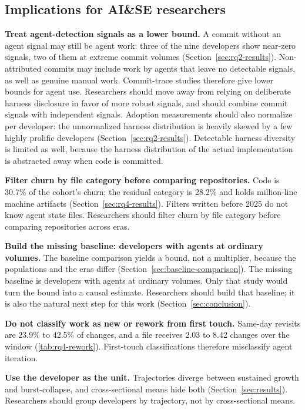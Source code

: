 \subsection{Implications for AI\&SE researchers}
\label{sec:implications-researchers}

\textbf{Treat agent-detection signals as a lower bound.}
A commit without an agent signal may still be agent work: three of the nine
developers show near-zero signals, two of them at extreme commit volumes
(Section~\ref{sec:rq2-results}).
Non-attributed commits may include work by agents that leave no detectable
signals, as well as genuine manual work.
Commit-trace studies therefore give lower bounds for agent use.
Researchers should move away from relying on deliberate harness disclosure in
favor of more robust signals, and should combine commit signals with
independent signals.
Adoption measurements should also normalize per developer: the unnormalized
harness distribution is heavily skewed by a few highly prolific developers
(Section~\ref{sec:rq2-results}).
Detectable harness diversity is limited as well, because the harness
distribution of the actual implementation is abstracted away when code is
committed.

\textbf{Filter churn by file category before comparing repositories.}
Code is 30.7\% of the cohort's churn; the residual category is 28.2\% and holds
million-line machine artifacts (Section~\ref{sec:rq4-results}).
Filters written before 2025 do not know agent state files.
Researchers should filter churn by file category before comparing repositories
across eras.

\textbf{Build the missing baseline: developers with agents at ordinary
volumes.}
The baseline comparison yields a bound, not a multiplier, because the
populations and the eras differ (Section~\ref{sec:baseline-comparison}).
The missing baseline is developers with agents at ordinary volumes.
Only that study would turn the bound into a causal estimate.
Researchers should build that baseline; it is also the natural next step for
this work (Section~\ref{sec:conclusion}).

\textbf{Do not classify work as new or rework from first touch.}
Same-day revisits are 23.9\% to 42.5\% of changes, and a file receives 2.03 to
8.42 changes over the window (\autoref{tab:rq4-rework}).
First-touch classifications therefore misclassify agent iteration.

\textbf{Use the developer as the unit.}
Trajectories diverge between sustained growth and burst-collapse, and
cross-sectional means hide both (Section~\ref{sec:results}).
Researchers should group developers by trajectory, not by cross-sectional means.

